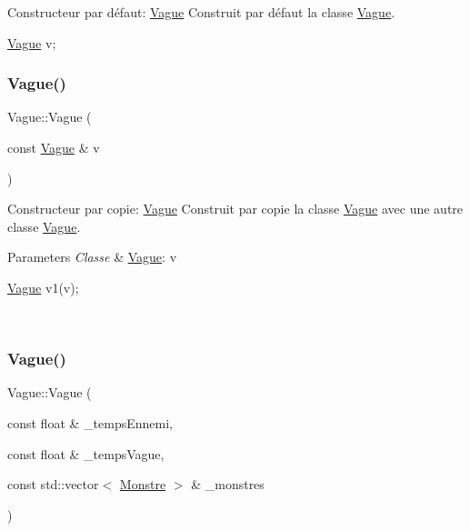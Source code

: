 Constructeur par défaut\+: \hyperlink{classVague}{Vague} Construit par défaut la classe \hyperlink{classVague}{Vague}. 


\begin{DoxyCode}
\hyperlink{classVague}{Vague} v;
\end{DoxyCode}
 \mbox{\label{classVague_aa1c2e536319c3b66880a5d7dd7cbb444}} 
\subsubsection{\texorpdfstring{Vague()}{Vague()}\hspace{0.1cm}{\footnotesize\ttfamily [2/3]}}
{\footnotesize\ttfamily Vague\+::\+Vague (\begin{DoxyParamCaption}\item[{const \hyperlink{classVague}{Vague} \&}]{v }\end{DoxyParamCaption})}



Constructeur par copie\+: \hyperlink{classVague}{Vague} Construit par copie la classe \hyperlink{classVague}{Vague} avec une autre classe \hyperlink{classVague}{Vague}. 


\begin{DoxyParams}{Parameters}
{\em Classe} & \hyperlink{classVague}{Vague}\+: v 
\begin{DoxyCode}
\hyperlink{classVague}{Vague} v1(v);
\end{DoxyCode}
 \\
\hline
\end{DoxyParams}
\mbox{\label{classVague_a676fd5a235236ec1bb0b9b6a974c3296}} 
\subsubsection{\texorpdfstring{Vague()}{Vague()}\hspace{0.1cm}{\footnotesize\ttfamily [3/3]}}
{\footnotesize\ttfamily Vague\+::\+Vague (\begin{DoxyParamCaption}\item[{const float \&}]{\+\_\+temps\+Ennemi,  }\item[{const float \&}]{\+\_\+temps\+Vague,  }\item[{const std\+::vector$<$ \hyperlink{classMonstre}{Monstre} $>$ \&}]{\+\_\+monstres }\end{DoxyParamCaption})}



